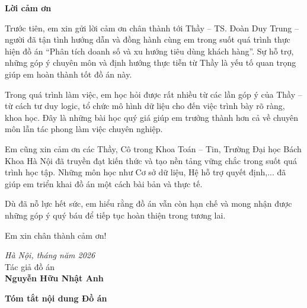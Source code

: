 \documentclass[oneside, a4paper]{book}
\theoremstyle{plain}
\theoremstyle{plain}
\theoremstyle{remark}
\theoremstyle{definition}
\theoremstyle{remark}
\begin{document}
	\newpage
	\fontsize{22pt}{16pt}\selectfont
	{\bfseries Lời cảm ơn}
	\fontsize{13pt}{16pt}\selectfont
	\bigskip
	\setlength{\parindent}{2em} %
	\setlength{\parskip}{0.5em} %
	
	Trước tiên, em xin gửi lời cảm ơn chân thành tới Thầy – TS. Đoàn Duy Trung – người đã tận tình hướng dẫn và đồng hành cùng em trong suốt quá trình thực hiện đồ án “Phân tích doanh số và xu hướng tiêu dùng khách hàng”. Sự hỗ trợ, những góp ý chuyên môn và định hướng thực tiễn từ Thầy là yếu tố quan trọng giúp em hoàn thành tốt đồ án này.
	
	Trong quá trình làm việc, em học hỏi được rất nhiều từ các lần góp ý của Thầy – từ cách tư duy logic, tổ chức mô hình dữ liệu cho đến việc trình bày rõ ràng, khoa học. Đây là những bài học quý giá giúp em trưởng thành hơn cả về chuyên môn lẫn tác phong làm việc chuyên nghiệp.
	
	Em cũng xin cảm ơn các Thầy, Cô trong Khoa Toán – Tin, Trường Đại học Bách Khoa Hà Nội đã truyền đạt kiến thức và tạo nền tảng vững chắc trong suốt quá trình học tập. Những môn học như Cơ sở dữ liệu, Hệ hỗ trợ quyết định,... đã giúp em triển khai đồ án một cách bài bản và thực tế.
	
	Dù đã nỗ lực hết sức, em hiểu rằng đồ án vẫn còn hạn chế và mong nhận được những góp ý quý báu để tiếp tục hoàn thiện trong tương lai.
	
	Em xin chân thành cảm ơn!
	
	
	
	\bigskip
	
	\begin{minipage}{0.5\textwidth}
	\end{minipage}
	\hspace{0.5\textwidth}
	\begin{minipage}{0.5\textwidth}
		\noindent\begin{center}
			\vspace{1cm}
			\textit{Hà Nội, tháng     năm 2026} \\
			Tác giả đồ án\\ \vspace{2cm}
			\textbf{Nguyễn Hữu Nhật Anh}
		\end{center}	
	\end{minipage}
	
	
	\bigskip
	
	\newpage
	\fontsize{22pt}{16pt}\selectfont
	{\bfseries Tóm tắt nội dung Đồ án}
	\fontsize{13pt}{16pt}\selectfont
	\bigskip
	
\end{document}

